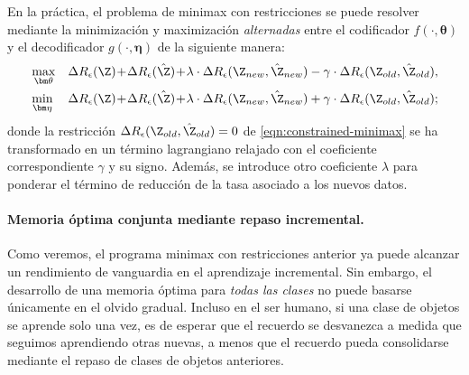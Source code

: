 \documentclass[../../book-main_es.tex]{subfiles}
\begin{document}
En la práctica, el problema de minimax con restricciones se puede resolver mediante la minimización y maximización {\em
alternadas} entre el codificador
$f(\cdot, \bm \theta)$ y el decodificador $g(\cdot, \bm \eta)$ de la siguiente manera:
\begin{eqnarray}
    &\max_{\bm \theta}
    &\Delta{R_\epsilon(\Z)}\!+\!\Delta{R_\epsilon(\hat{\Z})}\!+\!\lambda\cdot
    \Delta{R_\epsilon(\Z_{new},\hat{\Z}_{new})} - \gamma\cdot
    \Delta{R_\epsilon(\Z_{old},\hat{\Z}_{old})}, \label{eqn:relaxed-max}\\
    &\min_{\bm \eta}
    &\Delta{R_\epsilon(\Z)}\!+\!\Delta{R_\epsilon(\hat{\Z})}\!+\!\lambda\cdot
    \Delta{R_\epsilon(\Z_{new},\hat{\Z}_{new})} + \gamma\cdot
    \Delta{R_\epsilon(\Z_{old},\hat{\Z}_{old})}; \label{eqn:relaxed-min}
\end{eqnarray}
donde la restricción $\Delta R_\epsilon(\Z_{old},\hat{\Z}_{old}) = 0$
de \eqref{eqn:constrained-minimax} se ha transformado 
en un término lagrangiano relajado con el coeficiente correspondiente $\gamma$ y
su signo. Además, se introduce otro coeficiente $\lambda$ para
ponderar el término de reducción de la tasa asociado a los nuevos datos.

\paragraph{Memoria óptima conjunta mediante repaso incremental.}
Como veremos, el programa minimax con restricciones anterior ya puede
alcanzar un rendimiento de vanguardia en el aprendizaje incremental.
Sin embargo, el desarrollo de una memoria óptima para {\em todas las clases}
no puede basarse únicamente en el olvido gradual. Incluso en el ser humano, si una
clase de objetos se aprende solo una vez, es de esperar que el recuerdo
se desvanezca a medida que seguimos aprendiendo otras nuevas, a menos que el recuerdo
pueda consolidarse mediante el repaso de clases de objetos anteriores. %
\end{document}
